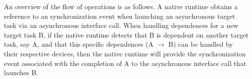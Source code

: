 An overview of the flow of operations is as follows. A native runtime obtains a reference to an synchronization event when launching an asynchronous target task via an asynchronous  interface call. When handling dependences for a new target task B, if the native runtime detects that B is dependent on another target task, say A, and that this specific dependences (A $\rightarrow$ B) can be handled by their respective devices, then the native runtime will provide the synchronization event associated with the completion of A to the asynchronous  interface call that launches B.

